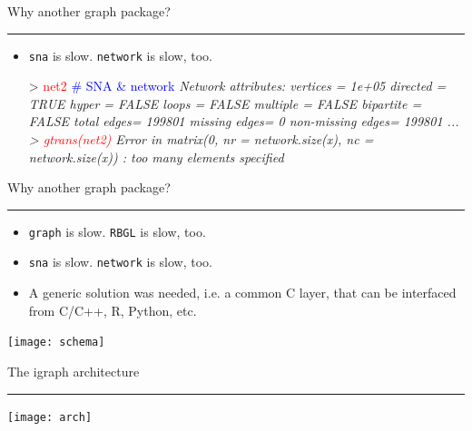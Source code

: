 \documentclass[landscape]{foils}
\newcommand{\stitle}[1]{{\centering\color{blue}\Large #1\par\vspace*{10pt}\hrule}}
\newcommand{\command}[1]{\textcolor{red}{#1}}
\newcommand{\comment}[1]{\textcolor{blue}{#1}}
\begin{document}
\newpage
\stitle{Why another graph package?}
\begin{itemize}
\item \texttt{sna} is slow. \texttt{network} is slow, too.
\begin{Myverb}
> \command{net2}\comment{                                  # SNA \& network}
\slshape  Network attributes:
\slshape   vertices = 1e+05 
\slshape   directed = TRUE 
\slshape   hyper = FALSE 
\slshape   loops = FALSE 
\slshape   multiple = FALSE 
\slshape   bipartite = FALSE 
\slshape   total edges= 199801 
\slshape     missing edges= 0 
\slshape     non-missing edges= 199801 
\slshape ... \pause
> \command{gtrans(net2)}
\slshape Error in matrix(0, nr = network.size(x), nc = network.size(x)) : 
\slshape   too many elements specified
\end{Myverb}
\end{itemize}

\newpage
\stitle{Why another graph package?}
\begin{itemize}
\item \texttt{graph} is slow. \texttt{RBGL} is slow, too.
\item \texttt{sna} is slow. \texttt{network} is slow, too.
\item A generic solution was needed, i.e. a common C layer, that 
  can be interfaced from C/C++, R, Python, etc.
\end{itemize} \pause
\begin{center}
\texttt{[image: schema]}
\end{center}

\newpage
\stitle{The igraph architecture}
\begin{center}
\vspace*{-2cm}
\texttt{[image: arch]}
\end{center}
\end{document}
